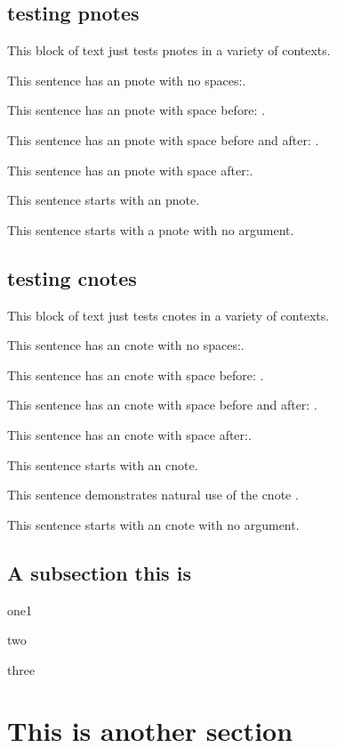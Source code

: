 \documentclass[draft]{compact_proposal}
\begin{document}
\subsection{testing pnotes}

This block of text just tests pnotes in a variety of contexts.

This sentence has an pnote with no spaces:.

This sentence has an pnote with space before: .

This sentence has an pnote with space before and after:  .

This sentence has an pnote with space after: .

 This sentence starts with an pnote.

\pnote This sentence starts with a pnote with no argument.



\subsection{testing cnotes}

This block of text just tests cnotes in a variety of contexts.

This sentence has an cnote with no spaces:.

This sentence has an cnote with space before: .

This sentence has an cnote with space before and after:  .

This sentence has an cnote with space after: .

 This sentence starts with an cnote.

This sentence demonstrates natural use of the cnote \cnote.

\cnote This sentence starts with an cnote with no argument.



\subsection{A subsection this is}
\blindtext[1]
\begin{tightitemize}
	\item one1
	\item two
	\item three
\end{tightitemize}



\section{This is another section}
\blindtext[6]
\end{document}
